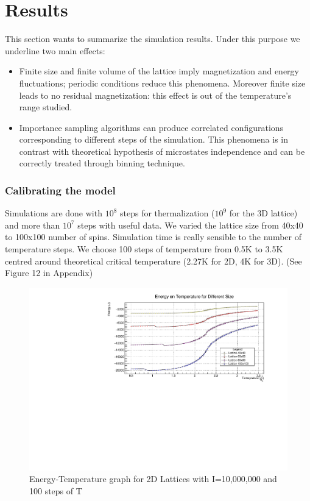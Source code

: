 \documentclass[11pt,a4paper]{article}
\begin{document}
\section{Results}
This section wants to summarize the simulation results. Under this purpose we underline two main effects:

\begin{itemize}
\item Finite size and finite volume of the lattice imply magnetization and energy fluctuations; periodic conditions reduce this phenomena. Moreover finite size leads to no residual magnetization: this effect is out of the temperature's range studied.

\item Importance sampling algorithms can produce correlated configurations corresponding to different steps of the simulation. This phenomena is in contrast with theoretical hypothesis of microstates independence and can be correctly treated through binning technique. 
\end{itemize}

\subsubsection*{Calibrating the model}
Simulations are done with $10^8$ steps for thermalization ($10^9$ for the 3D lattice) and more than $10^7$ steps with useful data. We varied the lattice size from 40x40 to 100x100 number of spins. Simulation time is really sensible to the number of temperature steps. We choose 100 steps of temperature from 0.5K to 3.5K centred around theoretical critical temperature (2.27K for 2D, 4K for 3D). (See Figure 12 in Appendix) 

\begin{figure}[h!]
  \centering
  \includegraphics[width=\columnwidth]{img/2d/c1.pdf}
  \caption{Energy-Temperature graph for 2D Lattices with I=10,000,000 and 100 steps of T}
\end{figure}
\end{document}
